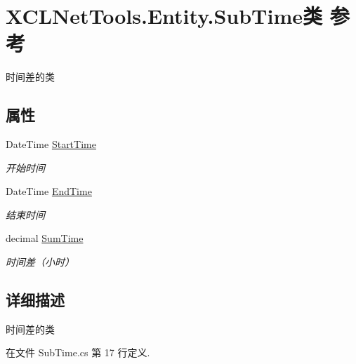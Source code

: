 \hypertarget{class_x_c_l_net_tools_1_1_entity_1_1_sub_time}{\section{X\-C\-L\-Net\-Tools.\-Entity.\-Sub\-Time类 参考}
\label{class_x_c_l_net_tools_1_1_entity_1_1_sub_time}
}


时间差的类  


\subsection*{属性}
\begin{DoxyCompactItemize}
\item 
Date\-Time \hyperlink{class_x_c_l_net_tools_1_1_entity_1_1_sub_time_a7813c7a0874535abbe0b5307d7310c27}{Start\-Time}
\begin{DoxyCompactList}\small\item\em 开始时间 \end{DoxyCompactList}\item 
Date\-Time \hyperlink{class_x_c_l_net_tools_1_1_entity_1_1_sub_time_a286d907d4beb9e6153f1abdb6f2c95fd}{End\-Time}
\begin{DoxyCompactList}\small\item\em 结束时间 \end{DoxyCompactList}\item 
decimal \hyperlink{class_x_c_l_net_tools_1_1_entity_1_1_sub_time_afe5aa74e0038c4b4342be84211c3f607}{Sum\-Time}
\begin{DoxyCompactList}\small\item\em 时间差（小时） \end{DoxyCompactList}\end{DoxyCompactItemize}


\subsection{详细描述}
时间差的类 



在文件 Sub\-Time.\-cs 第 17 行定义.



